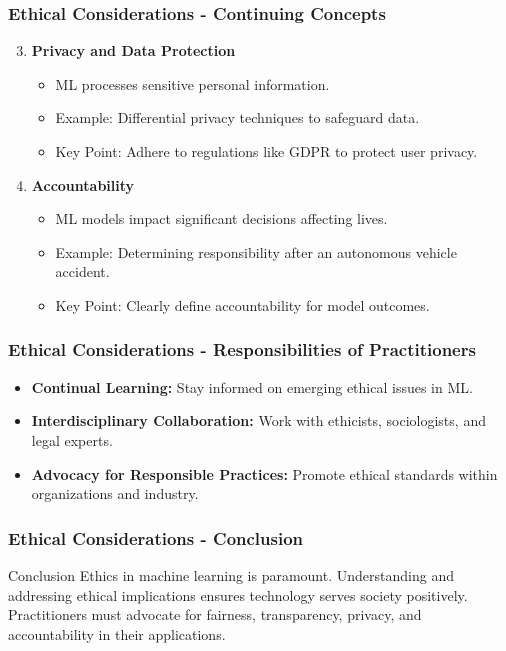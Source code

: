 \documentclass[aspectratio=169]{beamer}
\begin{document}
\begin{frame}[fragile]
    \frametitle{Ethical Considerations - Continuing Concepts}
    \begin{enumerate}
        \setcounter{enumi}{2} %
        \item \textbf{Privacy and Data Protection}
            \begin{itemize}
                \item ML processes sensitive personal information.
                \item Example: Differential privacy techniques to safeguard data.
                \item Key Point: Adhere to regulations like GDPR to protect user privacy.
            \end{itemize}

        \item \textbf{Accountability}
            \begin{itemize}
                \item ML models impact significant decisions affecting lives.
                \item Example: Determining responsibility after an autonomous vehicle accident.
                \item Key Point: Clearly define accountability for model outcomes.
            \end{itemize}
    \end{enumerate}
\end{frame}

\begin{frame}[fragile]
    \frametitle{Ethical Considerations - Responsibilities of Practitioners}
    \begin{itemize}
        \item \textbf{Continual Learning:} Stay informed on emerging ethical issues in ML.
        \item \textbf{Interdisciplinary Collaboration:} Work with ethicists, sociologists, and legal experts.
        \item \textbf{Advocacy for Responsible Practices:} Promote ethical standards within organizations and industry.
    \end{itemize}
\end{frame}

\begin{frame}[fragile]
    \frametitle{Ethical Considerations - Conclusion}
    \begin{block}{Conclusion}
        Ethics in machine learning is paramount. 
        Understanding and addressing ethical implications ensures technology serves society positively. 
        Practitioners must advocate for fairness, transparency, privacy, and accountability in their applications.
    \end{block}
\end{frame}
\end{document}
